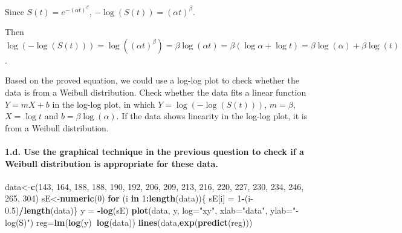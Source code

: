 \documentclass[]{article}
\newenvironment{Shaded}{\begin{snugshade}}{\end{snugshade}}
\newcommand{\ControlFlowTok}[1]{\textcolor[rgb]{0.13,0.29,0.53}{\textbf{#1}}}
\newcommand{\DataTypeTok}[1]{\textcolor[rgb]{0.13,0.29,0.53}{#1}}
\newcommand{\DecValTok}[1]{\textcolor[rgb]{0.00,0.00,0.81}{#1}}
\newcommand{\FloatTok}[1]{\textcolor[rgb]{0.00,0.00,0.81}{#1}}
\newcommand{\KeywordTok}[1]{\textcolor[rgb]{0.13,0.29,0.53}{\textbf{#1}}}
\newcommand{\NormalTok}[1]{#1}
\newcommand{\OperatorTok}[1]{\textcolor[rgb]{0.81,0.36,0.00}{\textbf{#1}}}
\newcommand{\StringTok}[1]{\textcolor[rgb]{0.31,0.60,0.02}{#1}}
\let\oldparagraph\paragraph
\renewcommand{\paragraph}[1]{\oldparagraph{#1}\mbox{}}
\begin{document}
Since \(S(t) = e^{-(\alpha t)^{\beta}}\),
\(−\log(S(t)) = (\alpha t)^{\beta}\).

Then
\(\log(−\log(S(t))) = \log((\alpha t)^{\beta}) = \beta \log(\alpha t) = \beta(\log \alpha + \log t) = \beta \log(\alpha) + \beta \log(t)\).

Based on the proved equation, we could use a log-log plot to check
whether the data is from a Weibull distribution. Check whether the data
fits a linear function \(Y = m X + b\) in the log-log plot, in which
\(Y = \log(−\log(S(t)))\), \(m = \beta\), \(X = \log t\) and
\(b = \beta \log(\alpha)\). If the data shows linearity in the log-log
plot, it is from a Weibull distribution.

\hypertarget{d.-use-the-graphical-technique-in-the-previous-question-to-check-if-a-weibull-distribution-is-appropriate-for-these-data.}{%
\paragraph{1.d. Use the graphical technique in the previous question to
check if a Weibull distribution is appropriate for these
data.}\label{d.-use-the-graphical-technique-in-the-previous-question-to-check-if-a-weibull-distribution-is-appropriate-for-these-data.}}

\begin{Shaded}
\begin{Highlighting}[]
\NormalTok{data<-}\KeywordTok{c}\NormalTok{(}\DecValTok{143}\NormalTok{, }\DecValTok{164}\NormalTok{, }\DecValTok{188}\NormalTok{, }\DecValTok{188}\NormalTok{, }\DecValTok{190}\NormalTok{, }\DecValTok{192}\NormalTok{, }\DecValTok{206}\NormalTok{, }\DecValTok{209}\NormalTok{, }\DecValTok{213}\NormalTok{, }\DecValTok{216}\NormalTok{, }\DecValTok{220}\NormalTok{, }\DecValTok{227}\NormalTok{, }\DecValTok{230}\NormalTok{, }\DecValTok{234}\NormalTok{, }\DecValTok{246}\NormalTok{, }\DecValTok{265}\NormalTok{, }\DecValTok{304}\NormalTok{)}
\NormalTok{sE<-}\KeywordTok{numeric}\NormalTok{(}\DecValTok{0}\NormalTok{)}
\ControlFlowTok{for}\NormalTok{ (i }\ControlFlowTok{in} \DecValTok{1}\OperatorTok{:}\KeywordTok{length}\NormalTok{(data))\{}
\NormalTok{  sE[i] =}\StringTok{ }\DecValTok{1}\OperatorTok{-}\NormalTok{(i}\FloatTok{-0.5}\NormalTok{)}\OperatorTok{/}\KeywordTok{length}\NormalTok{(data)\}}
\NormalTok{y =}\StringTok{ }\OperatorTok{-}\KeywordTok{log}\NormalTok{(sE)}
\KeywordTok{plot}\NormalTok{(data, y, }\DataTypeTok{log=}\StringTok{"xy"}\NormalTok{, }\DataTypeTok{xlab=}\StringTok{"data"}\NormalTok{, }\DataTypeTok{ylab=}\StringTok{"-log(S)"}\NormalTok{)}
\NormalTok{reg=}\KeywordTok{lm}\NormalTok{(}\KeywordTok{log}\NormalTok{(y)}\OperatorTok{~}\KeywordTok{log}\NormalTok{(data))}
\KeywordTok{lines}\NormalTok{(data,}\KeywordTok{exp}\NormalTok{(}\KeywordTok{predict}\NormalTok{(reg)))}
\end{Highlighting}
\end{Shaded}
\end{document}
